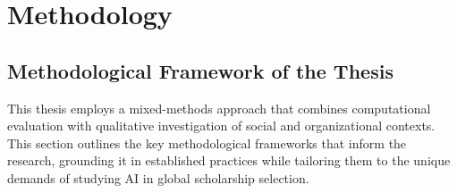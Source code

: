 \chapter{\label{ch:methods}Methodology}

\minitoc

\section{Methodological Framework of the Thesis}\label{sec:context_methodology}

This thesis employs a mixed-methods approach that combines computational evaluation with qualitative investigation of social and organizational contexts. This section outlines the key methodological frameworks that inform the research, grounding it in established practices while tailoring them to the unique demands of studying AI in global scholarship selection.

